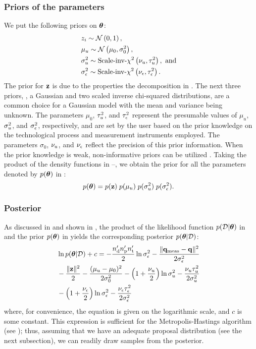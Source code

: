 \subsubsection{Priors of the parameters}
We put the following priors on ${\boldsymbol\theta}$:
\begin{align}
  & \z_i \sim \gaussian{0}{1}, \elabel{z-prior} \\
  & \mu_\u \sim \gaussian{\mu_0}{\sigma^2_0}, \elabel{mu-u-prior} \\
  & \sigma^2_\u \sim \sichisquared{\nu_\u}{\tau^2_\u}, \text{ and} \elabel{sigma2-u-prior} \\
  & \sigma^2_\noise \sim \sichisquared{\nu_\noise}{\tau^2_\noise}. \elabel{sigma2-noise-prior}
\end{align}
The prior for $\mathbf{z}$ is due to the properties the decomposition in .
The next three priors, \ie, a Gaussian and two scaled inverse chi-squared distributions, are a common choice for a Gaussian model with the mean and variance being unknown.
The parameters $\mu_0$, $\tau^2_u$, and $\tau^2_\epsilon$ represent the presumable values of $\mu_u$, $\sigma^2_u$, and $\sigma^2_\epsilon$, respectively, and are set by the user based on the prior knowledge on the technological process and measurement instruments employed. The parameters $\sigma_0$, $\nu_u$, and $\nu_\epsilon$ reflect the precision of this prior information.
When the prior knowledge is weak, non-informative priors can be utilized \cite{gelman2004, bernardo2007}.
Taking the product of the density functions in --, we obtain the prior for all the parameters denoted by $\f{\vparam}$ in :
\begin{equation} \elabel{prior}
  \f{\vparam} = \f{\vz} \; \f{\mu_\u} \; \f{\sigma^2_\u} \; \f{\sigma^2_\noise}.
\end{equation}

\subsubsection{Posterior}
As discussed in  and shown in , the product of the likelihood function $\f{\Data | \vparam}$ in  and the prior $\f{\vparam}$ in  yields the corresponding posterior $\f{\vparam | \Data}$:
\begin{align}
  & \ln \f{\vparam | \Data} + c = -\frac{\nrdies \nrprocs \nrsteps}{2} \ln \sigma^2_\noise - \frac{\norm{\mvT_\meas - \mvT}^2}{2 \sigma^2_\noise} \nonumber \\
  & {} - \frac{\norm{\vz}^2}{2} - \frac{(\mu_\u - \mu_0)^2}{2 \sigma^2_0} - \left(1 + \frac{\nu_\u}{2}\right) \ln \sigma^2_\u - \frac{\nu_\u \tau_\u^2}{2 \sigma^2_\u} \nonumber \\
  & {} - \left(1 + \frac{\nu_\noise}{2}\right) \ln \sigma^2_\noise - \frac{\nu_\noise \tau_\noise^2}{2 \sigma^2_\noise} \elabel{log-posterior}
\end{align}
where, for convenience, the equation is given on the logarithmic scale, and $c$ is some constant. This expression is sufficient for the Metropolis-Hastings algorithm (see ); thus, assuming that we have an adequate proposal distribution (see the next subsection), we can readily draw samples from the posterior.
